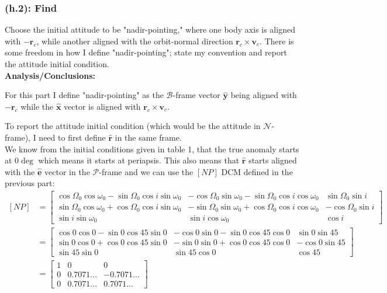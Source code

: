 \documentclass[titlepage]{article}
\begin{document}
\subsubsection*{(h.2): Find}
Choose the initial attitude to be "nadir-pointing," where one body axis is aligned with $-\boldsymbol{r}_c$, while another aligned with the orbit-normal direction $\boldsymbol{r}_c\times\boldsymbol{v}_c$. There is some freedom in how I define "nadir-pointing"; state my convention and report the attitude initial condition.\\

\textbf{Analysis/Conclusions:}
\begin{mdframed}[linewidth=1pt, innertopmargin=10pt, innerbottommargin=10pt]
	For this part I define "nadir-pointing" as the $\mathcal{B}$-frame vector $\hat{\boldsymbol{y}}$ being aligned with $-\boldsymbol{r}_c$ while the $\hat{\boldsymbol{x}}$ vector is aligned with $\boldsymbol{r}_c\times\boldsymbol{v}_c$.
\end{mdframed}
To report the attitude initial condition (which would be the attitude in $\mathcal{N}$-frame), I need to first define $\hat{\boldsymbol{r}}$ in the same frame.\\

We know from the initial conditions given in table 1, that the true anomaly starts at $0\deg$ which means it starts at periapsis. This also means that $\hat{\boldsymbol{r}}$ starts aligned with the $\hat{\boldsymbol{e}}$ vector in the $\mathcal{P}$-frame and we can use the $[NP]$ DCM defined in the previous part:
\tiny
\begin{equation}
	\begin{split}
		\left[NP\right]&=
		\begin{bmatrix}
			\cos{\Omega_0}\cos{\omega_0}-\sin{\Omega_0}\cos{i}\sin{\omega_0} & -\cos{\Omega_0}\sin{\omega_0}-\sin{\Omega_0}\cos{i}\cos{\omega_0} & \sin{\Omega_0}\sin{i}\\
			\sin{\Omega_0}\cos{\omega_0}+\cos{\Omega_0}\cos{i}\sin{\omega_0} & -\sin{\Omega_0}\sin{\omega_0}+\cos{\Omega_0}\cos{i}\cos{\omega_0} & -\cos{\Omega_0}\sin{i}\\
			\sin{i}\sin{\omega_0} & \sin{i}\cos{\omega_0} & \cos{i}
		\end{bmatrix}\\
		&=
		\begin{bmatrix}
			\cos{0}\cos{0}-\sin{0}\cos{45}\sin{0} & -\cos{0}\sin{0}-\sin{0}\cos{45}\cos{0} & \sin{0}\sin{45}\\
			\sin{0}\cos{0}+\cos{0}\cos{45}\sin{0} & -\sin{0}\sin{0}+\cos{0}\cos{45}\cos{0} & -\cos{0}\sin{45}\\
			\sin{45}\sin{0} & \sin{45}\cos{0} & \cos{45}
		\end{bmatrix}\\
		&=
		\begin{bmatrix}
			1 & 0 & 0\\
			0 & 0.7071... & -0.7071... \\
			0 & 0.7071... & 0.7071...
		\end{bmatrix}
	\end{split}
\end{equation}
\normalsize
\end{document}
